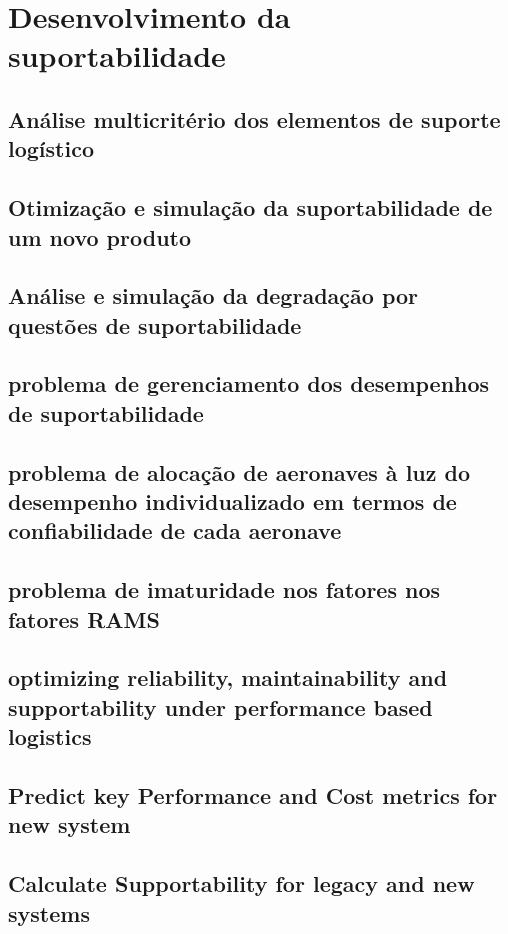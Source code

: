 \documentclass{article}
\begin{document}
\section{Desenvolvimento da suportabilidade}

\subsection{Análise multicritério dos elementos de suporte logístico}

\subsection{Otimização e simulação da suportabilidade de um novo produto}

\subsection{Análise e simulação da degradação por questões de suportabilidade}

\subsection{problema de gerenciamento dos desempenhos de suportabilidade}

\subsection{problema de alocação de aeronaves à luz do desempenho individualizado em termos de confiabilidade de cada aeronave}

\subsection{problema de imaturidade nos fatores nos fatores RAMS}

\subsection{optimizing reliability, maintainability and supportability under performance based logistics}

\subsection{Predict key Performance and Cost metrics for new system}

\subsection{Calculate Supportability for legacy and new systems}
\end{document}
